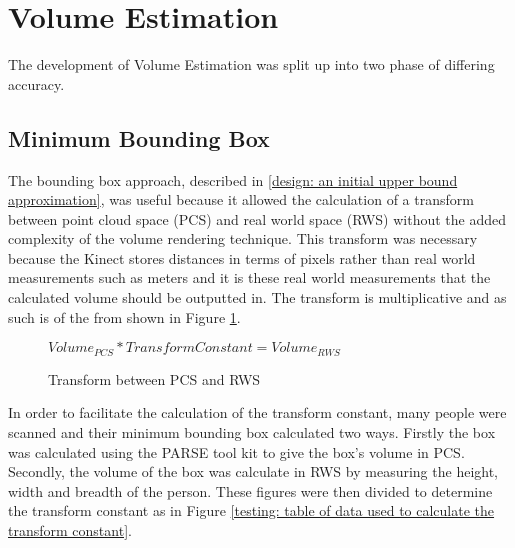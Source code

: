 \section{Volume Estimation}
\label{volume estimation}
The development of Volume Estimation was split up into two phase of differing accuracy.
\subsection{Minimum Bounding Box}
\label{testing: minimum bounding box}
The bounding box approach, described in \ref{design: an initial upper bound approximation}, was useful because it allowed the calculation of a transform between point cloud space (PCS) and real world space (RWS) without the added complexity of the volume rendering technique. This transform was necessary because the Kinect stores distances in terms of pixels rather than real world measurements such as meters and it is these real world measurements that the calculated volume should be outputted in. The transform is multiplicative and as such is of the from shown in Figure \ref{testing: transform between pcs and rws}.\\

\begin{figure}[h]
\begin{center}
$Volume_{PCS} * Transform Constant = Volume_{RWS}$
\end{center}
\caption{Transform between PCS and RWS}
\label{testing: transform between pcs and rws}
\end{figure}

In order to facilitate the calculation of the transform constant, many people were scanned and their minimum bounding box calculated two ways. Firstly the box was calculated using the PARSE tool kit to give the box's volume in PCS. Secondly, the volume of the box was calculate in RWS by measuring the height, width and breadth of the person. These figures were then divided to determine the transform constant as in Figure \ref{testing: table of data used to calculate the transform constant}.

